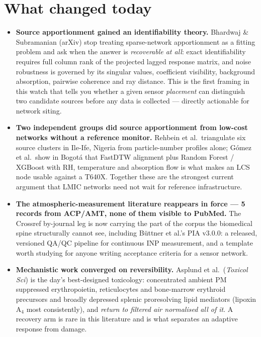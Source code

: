\documentclass[10pt]{article}
\begin{document}
\section*{\sffamily\bfseries\color{Deep}What changed today}
\vspace{-1.5mm}{\color{Amber}\rule{\linewidth}{1.1pt}}\vspace{2.5mm}

\footnotesize
\begin{itemize}
\item \textbf{Source apportionment gained an identifiability theory.} Bhardwaj \&
Subramanian (arXiv) stop treating sparse-network apportionment as a fitting problem and
ask when the answer is \emph{recoverable at all}: exact identifiability requires full
column rank of the projected lagged response matrix, and noise robustness is governed by
its singular values, coefficient visibility, background absorption, pairwise coherence
and ray distance. This is the first framing in this watch that tells you whether a given
sensor \emph{placement} can distinguish two candidate sources before any data is
collected --- directly actionable for network siting.

\item \textbf{Two independent groups did source apportionment from low-cost networks
without a reference monitor.} Rehbein et al.\ triangulate six source clusters in Ile-Ife,
Nigeria from particle-number profiles alone; G\'omez et al.\ show in Bogot\'a that FastDTW
alignment plus Random Forest / XGBoost with RH, temperature and absorption flow is what
makes an LCS node usable against a T640X. Together these are the strongest current
argument that LMIC networks need not wait for reference infrastructure.

\item \textbf{The atmospheric-measurement literature reappears in force --- 5 records from
ACP/AMT, none of them visible to PubMed.} The Crossref by-journal leg is now carrying the
part of the corpus the biomedical spine structurally cannot see, including B\"uttner
et al.'s PIA v3.0.0: a released, versioned QA/QC pipeline for continuous INP measurement,
and a template worth studying for anyone writing acceptance criteria for a sensor network.

\item \textbf{Mechanistic work converged on reversibility.} Asplund et al.\
(\textit{Toxicol Sci}) is the day's best-designed toxicology: concentrated ambient PM
suppressed erythropoietin, reticulocytes and bone-marrow erythroid precursors and broadly
depressed splenic proresolving lipid mediators (lipoxin A$_4$ most consistently), and
\emph{return to filtered air normalised all of it}. A recovery arm is rare in this
literature and is what separates an adaptive response from damage.


\end{itemize}
\end{document}
